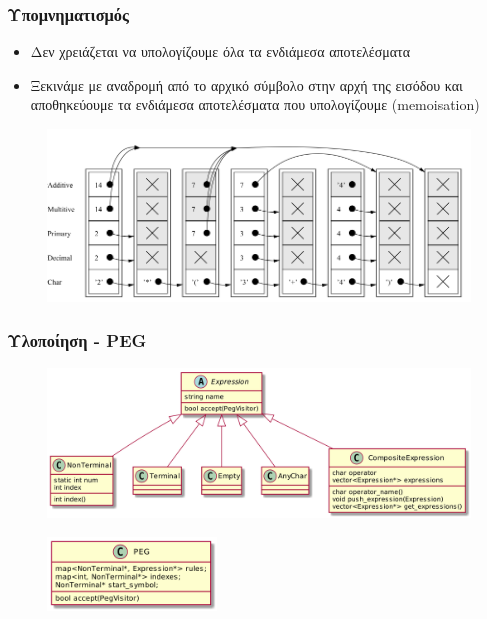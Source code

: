 \documentclass{beamer}
\begin{document}
\begin{frame}
  \frametitle{Υπομνηματισμός}
  \begin{itemize}
	\item Δεν χρειάζεται να υπολογίζουμε όλα τα ενδιάμεσα αποτελέσματα
	\item Ξεκινάμε με αναδρομή από το αρχικό σύμβολο στην αρχή της εισόδου και αποθηκεύουμε τα ενδιάμεσα αποτελέσματα που υπολογίζουμε (memoisation) \pause
  \end{itemize}

\begin{figure}[h]
    \centering
	\includegraphics[width=1.00\textwidth]{../transcript/pics/packrat_memo_example}
\end{figure}

\end{frame}

\begin{frame}
  \frametitle{Υλοποίηση - PEG}
\begin{figure}[h]
    \centering
	\includegraphics[width=1.05\textwidth]{../transcript/uml/peg_elements}
\end{figure} \pause
\begin{figure}[h]
    \centering
	\includegraphics[width=0.40\textwidth]{../transcript/uml/peg}
\end{figure}
\end{frame}
\end{document}
